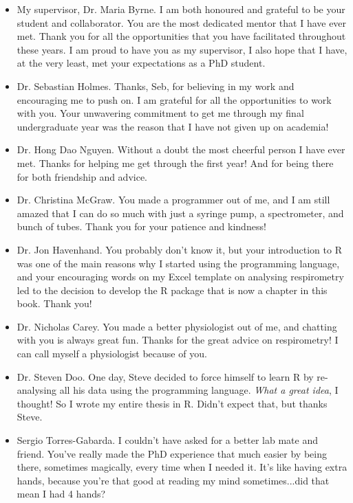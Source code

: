 \documentclass[
  oneside, 11pt, a4paper]{memoir}
\begin{document}
\begin{itemize}
  \item My supervisor, Dr. Maria Byrne. I am both honoured and grateful to be your student and collaborator. You are the most dedicated mentor that I have ever met. Thank you for all the opportunities that you have facilitated throughout these years. I am proud to have you as my supervisor, I also hope that I have, at the very least, met your expectations as a PhD student.
  \item Dr. Sebastian Holmes. Thanks, Seb, for believing in my work and encouraging me to push on. I am grateful for all the opportunities to work with you. Your unwavering commitment to get me through my final undergraduate year was the reason that I have not given up on academia!
  \item Dr. Hong Dao Nguyen. Without a doubt the most cheerful person I have ever met. Thanks for helping me get through the first year! And for being there for both friendship and advice. 
  \item Dr. Christina McGraw.  You made a programmer out of me, and I am still amazed that I can do so much with just a syringe pump, a spectrometer, and bunch of tubes. Thank you for your patience and kindness!
  \item Dr. Jon Havenhand. You probably don't know it, but your introduction to R was one of the main reasons why I started using the programming language, and your encouraging words on my Excel template on analysing respirometry led to the decision to develop the R package that is now a chapter in this book. Thank you!
  \item Dr. Nicholas Carey. You made a better physiologist out of me, and chatting with you is always great fun. Thanks for the great advice on respirometry! I can call myself a physiologist because of you.
  \item Dr. Steven Doo. One day, Steve decided to force himself to learn R by re-analysing all his data using the programming language. \textit{What a great idea}, I thought! So I wrote my entire thesis in R. Didn't expect that, but thanks Steve.
  \item Sergio Torres-Gabarda. I couldn't have asked for a better lab mate and friend. You've really made the PhD experience that much easier by being there, sometimes magically, every time when I needed it. It's like having extra hands, because you're that good at reading my mind sometimes...did that mean I had 4 hands?

\end{itemize}
\end{document}

